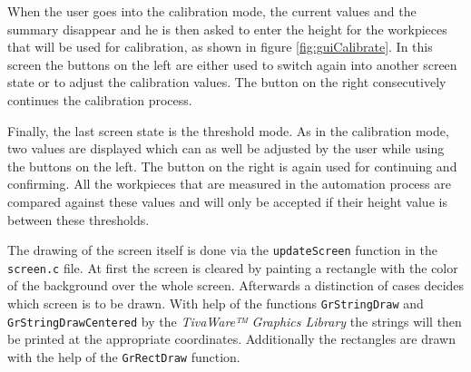 When the user goes into the calibration mode, the current values and the summary disappear and he is then asked to enter the height for the workpieces that will be used for calibration, as shown in figure \ref{fig:guiCalibrate}.
In this screen the buttons on the left are either used to switch again into another screen state or to adjust the calibration values.
The button on the right consecutively continues the calibration process.

Finally, the last screen state is the threshold mode.
As in the calibration mode, two values are displayed which can as well be adjusted by the user while using the buttons on the left.
The button on the right is again used for continuing and confirming.
All the workpieces that are measured in the automation process are compared against these values and will only be accepted if their height value is between these thresholds.

The drawing of the screen itself is done via the \texttt{updateScreen} function in the \texttt{screen.c} file.
At first the screen is cleared by painting a rectangle with the color of the background over the whole screen.
Afterwards a distinction of cases decides which screen is to be drawn.
With help of the functions \texttt{GrStringDraw} and \texttt{GrStringDrawCentered}  by the \textit{TivaWare™ Graphics Library} the strings will then be printed at the appropriate coordinates. 
Additionally the rectangles are drawn with the help of the \texttt{GrRectDraw} function.
